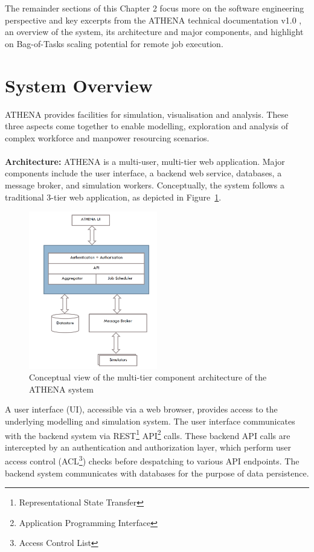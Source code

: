 The remainder sections of this Chapter 2 focus more on the software engineering perspective and key excerpts from the ATHENA technical documentation v1.0 \parencite{athenaAllDoc}, an overview of the system, its architecture and major components, and highlight on Bag-of-Tasks scaling potential for remote job execution.

\section{System Overview}

ATHENA provides facilities for simulation, visualisation and analysis. These three aspects come together to enable modelling, exploration and analysis of complex workforce and manpower resourcing scenarios.
\\
\\
\textbf{Architecture:} \quad ATHENA is a multi-user, multi-tier web application. Major components include the user interface, a backend web service, databases, a message broker, and simulation workers. Conceptually, the system follows a traditional 3-tier web application, as depicted in Figure~\ref{fig:conceptArch}. 

\begin{figure}
\centering
\includegraphics[width=0.5\textwidth]{Figures/ATHENA_conceptual_architecture}
\decoRule
\caption[ATHENA Conceptual Architecture]{Conceptual view of the multi-tier component architecture of the ATHENA system}
\label{fig:conceptArch}
\end{figure}

A user interface (UI), accessible via a web browser, provides access to the underlying modelling and simulation system. The user interface communicates with the backend system via REST\footnote{Representational State Transfer} API\footnote{Application Programming Interface} calls. These backend API calls are intercepted by an authentication and authorization layer, which perform user access control (ACL\footnote{Access Control List}) checks before despatching to various API endpoints. The backend system communicates with databases for the purpose of data persistence.

